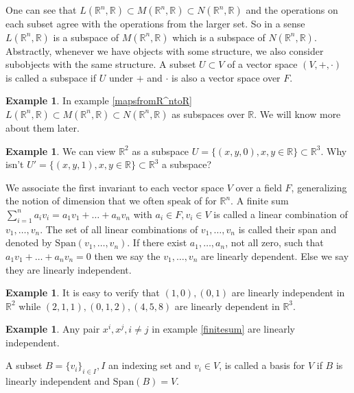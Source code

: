 \documentclass[12pt]{amsart}
\theoremstyle{definition}
\newtheorem{example}[theorem]{Example}
\begin{document}
One can see that $L(\mathbb{R}^n, \mathbb{R}) \subset M(\mathbb{R}^n, \mathbb{R}) \subset N(\mathbb{R}^n, \mathbb{R})$ and the operations on each subset agree with the operations from the larger set. So in a sense $L(\mathbb{R}^n, \mathbb{R})$ is a subspace of $M(\mathbb{R}^n, \mathbb{R})$ which is a subspace of $N(\mathbb{R}^n, \mathbb{R})$. Abstractly, whenever we have objects with some structure, we also consider subobjects with the same structure.
\dfn A subset $U \subset V$ of a vector space $(V, +, \cdot)$ is called a subspace if $U$ under $+$ and $\cdot$ is also a vector space over $F$.

\begin{example} In example \ref{mapsfromR^ntoR} $L(\mathbb{R}^n, \mathbb{R}) \subset M(\mathbb{R}^n, \mathbb{R}) \subset N(\mathbb{R}^n, \mathbb{R})$ as subspaces over $\mathbb{R}$. We will know more about them later.
\end{example}

\begin{example} \label{R2inR3} We can view $\mathbb{R}^2$ as a subspace $U = \{(x, y,0), x, y \in \mathbb{R}\} \subset \mathbb{R}^3$. Why isn't $U' = \{(x, y,1), x, y \in \mathbb{R}\} \subset \mathbb{R}^3$ a subspace?
\end{example}

We associate the first invariant to each vector space $V$ over a field $F$, generalizing the notion of dimension that we often speak of for $\mathbb{R}^n$.
\dfn A finite sum $\sum\limits_{i=1}^n a_iv_i = a_1v_1 + \ldots + a_n v_n$ with $a_i \in F, v_i \in V$ is called a linear combination of $v_1, \dots , v_n$. The set of all linear combinations of $v_1, \dots , v_n$ is called their span and denoted by $\text{Span}(v_1, \dots , v_n)$. If there exist $a_1, \dots , a_n$, not all zero, such that $a_1v_1 + \ldots + a_n v_n = 0$ then we say the $v_1, \dots , v_n$ are linearly dependent. Else we say they are linearly independent.

\begin{example} It is easy to verify that $(1,0), (0,1)$ are linearly independent in $\mathbb{R}^2$ while $(2, 1, 1), (0, 1, 2), (4, 5, 8)$ are linearly dependent in $\mathbb{R}^3$.
\end{example}

\begin{example} Any pair $x^i, x^j, i \neq j$ in example \ref{finitesum} are linearly independent.
\end{example}

\dfn A subset $B = \{v_i\}_{i \in I}, I$ an indexing set and $v_i \in V$, is called a basis for $V$ if $B$ is linearly independent and $\text{Span}(B) = V$.
\end{document}
